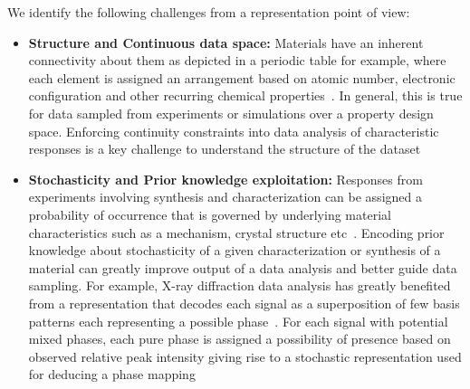 We identify the following challenges from a  representation point of view:
\begin{itemize}
    \item {\textbf{Structure and Continuous data space: }Materials have an inherent connectivity about them as depicted in a periodic table for example, where each element is assigned an arrangement based on atomic number, electronic configuration and other recurring chemical properties~\cite{periodictable}. In general, this is true for data sampled from experiments or simulations over a property design space. Enforcing continuity constraints into data analysis of characteristic responses is a key challenge to understand the structure of the dataset~\cite{lebras2011constraint}}
    \item {\textbf{Stochasticity and Prior knowledge exploitation: } Responses from experiments involving synthesis and characterization can be assigned a probability of occurrence that is governed by underlying material characteristics such as a mechanism, crystal structure etc~\cite{hull2018stochasticity}. Encoding prior knowledge about stochasticity of a given characterization or synthesis of a material can greatly improve output of a data analysis and better guide data sampling.  For example, X-ray diffraction data analysis has greatly benefited from a representation that decodes each signal as a superposition of few basis patterns each representing a possible phase~\cite{Kusne2015HighthroughputDO,hattrick2016perspective}. For each signal with potential mixed phases, each pure phase is assigned a possibility of presence based on observed relative peak intensity giving rise to a stochastic representation used for deducing a phase mapping~\cite{gomes2019crystal,stanev2018unsupervised}}
\end{itemize}


